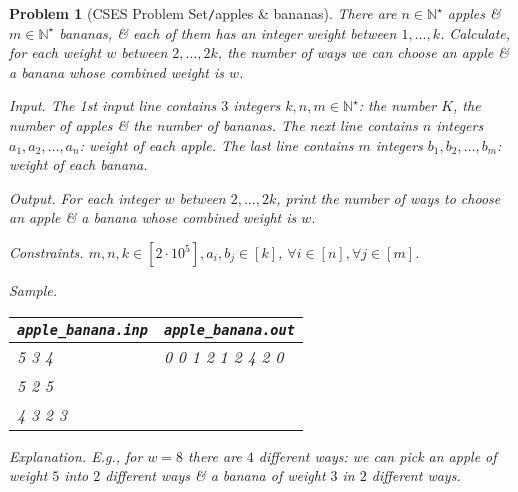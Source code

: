 \documentclass{article}
\newtheorem{problem}{Problem}
\begin{document}
\begin{problem}[CSES Problem Set{\tt/}apples \& bananas]
    There are $n\in\mathbb{N}^\star$ apples \& $m\in\mathbb{N}^\star$ bananas, \& each of them has an integer weight between $1,\ldots,k$. Calculate, for each weight $w$ between $2,\ldots,2k$, the number of ways we can choose an apple \& a banana whose combined weight is $w$.
    \item {\sf Input.} The 1st input line contains $3$ integers $k,n,m\in\mathbb{N}^\star$: the number $K$, the number of apples \& the number of bananas. The next line contains $n$ integers $a_1,a_2,\ldots,a_n$: weight of each apple. The last line contains $m$ integers $b_1,b_2,\ldots,b_m$: weight of each banana.
    \item {\sf Output.} For each integer $w$ between $2,\ldots,2k$, print the number of ways to choose an apple \& a banana whose combined weight is $w$.
    \item {\sf Constraints.} $m,n,k\in[2\cdot10^5],a_i,b_j\in[k]$, $\forall i\in[n],\forall j\in[m]$.
    \item {\sf Sample.}
    \begin{table}[H]
        \centering
        \begin{tabular}{|l|l|}
            \hline
            \verb|apple_banana.inp| & \verb|apple_banana.out| \\
            \hline
            5 3 4 & 0 0 1 2 1 2 4 2 0 \\
            5 2 5 & \\
            4 3 2 3 & \\
            \hline
        \end{tabular}
    \end{table}
    \item {\sf Explanation.} E.g., for $w = 8$ there are $4$ different ways: we can pick an apple of weight $5$ into $2$ different ways \& a banana of weight $3$ in $2$ different ways.
\end{problem}
\end{document}
